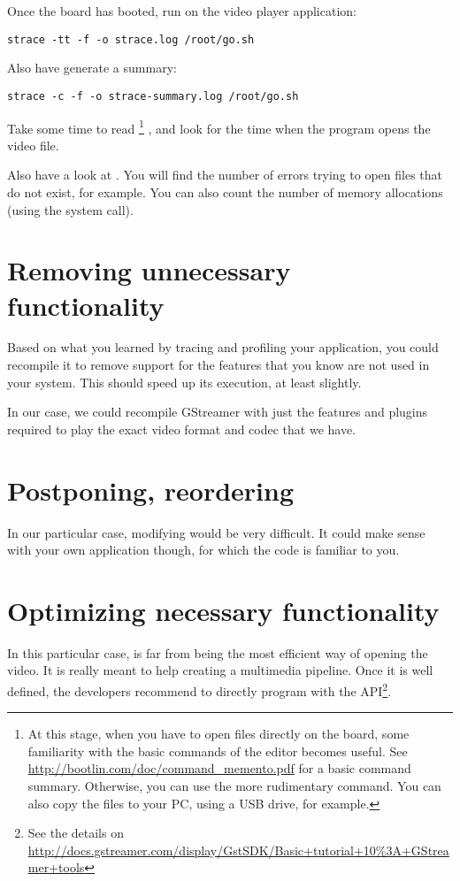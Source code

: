 Once the board has booted, run  on the video player
application:

\begin{verbatim}
strace -tt -f -o strace.log /root/go.sh
\end{verbatim}

Also have  generate a summary:

\begin{verbatim}
strace -c -f -o strace-summary.log /root/go.sh
\end{verbatim}

Take some time to read \footnote{
At this stage, when you have to open files directly on the
board, some familiarity with the basic commands of the  editor
becomes useful. See
\url{http://bootlin.com/doc/command_memento.pdf} for a basic
command summary. Otherwise, you can use the more rudimentary 
command. You can also copy the files to your PC, using a USB drive, for
example.}
, and look for the time when the program opens the video file.

Also have a look at . You will find the number
of errors trying to open files that do not exist, for example. You can
also count the number of memory allocations (using the  system call).

\section{Removing unnecessary functionality}

Based on what you learned by tracing and profiling your application, you
could recompile it to remove support for the features that you know are
not used in your system. This should speed up its execution, at least
slightly.

In our case, we could recompile GStreamer with just the features
and plugins required to play the exact video format and codec that we
have.

\section{Postponing, reordering}

In our particular case, modifying  would be very
difficult. It could make sense with your own application though, for
which the code is familiar to you.

\section{Optimizing necessary functionality}

In this particular case,  is far from being the most
efficient way of opening the video. It is really meant to help creating
a multimedia pipeline. Once it is well defined, the 
developers recommend to directly program with the 
API\footnote{See the details on
\url{http://docs.gstreamer.com/display/GstSDK/Basic+tutorial+10\%3A+GStreamer+tools}}.

